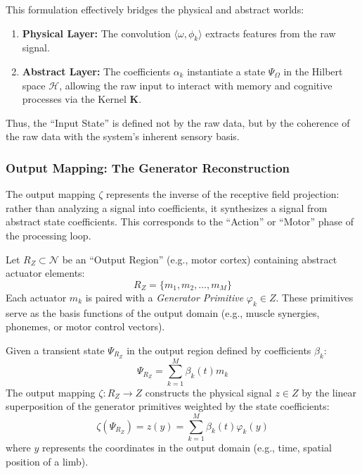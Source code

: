 \documentclass{article}
\begin{document}
This formulation effectively bridges the physical and abstract worlds:
\begin{enumerate}
    \item \textbf{Physical Layer:} The convolution $\langle \omega, \phi_k \rangle$ extracts features from the raw signal.
    \item \textbf{Abstract Layer:} The coefficients $\alpha_k$ instantiate a state $\Psi_\Omega$ in the Hilbert space $\mathcal{H}$, allowing the raw input to interact with memory and cognitive processes via the Kernel $\mathbf{K}$.
\end{enumerate}

Thus, the ``Input State'' is defined not by the raw data, but by the coherence of the raw data with the system's inherent sensory basis.

\subsubsection{Output Mapping: The Generator Reconstruction}
The output mapping $\zeta$ represents the inverse of the receptive field projection: rather than analyzing a signal into coefficients, it synthesizes a signal from abstract state coefficients. This corresponds to the ``Action'' or ``Motor'' phase of the processing loop.

Let $R_Z \subset \mathcal{N}$ be an ``Output Region'' (e.g., motor cortex) containing abstract actuator elements:
\begin{equation}
    R_Z = \{ m_1, m_2, \dots, m_M \}
\end{equation}
Each actuator $m_k$ is paired with a \textit{Generator Primitive} $\varphi_k \in Z$. These primitives serve as the basis functions of the output domain (e.g., muscle synergies, phonemes, or motor control vectors).

Given a transient state $\Psi_{R_Z}$ in the output region defined by coefficients $\beta_k$:
\begin{equation}
    \Psi_{R_Z} = \sum_{k=1}^M \beta_k(t) m_k
\end{equation}
The output mapping $\zeta : R_Z \to Z$ constructs the physical signal $z \in Z$ by the linear superposition of the generator primitives weighted by the state coefficients:
\begin{equation}
    \zeta(\Psi_{R_Z}) = z(y) = \sum_{k=1}^M \beta_k(t) \varphi_k(y)
\end{equation}
where $y$ represents the coordinates in the output domain (e.g., time, spatial position of a limb).
\end{document}
